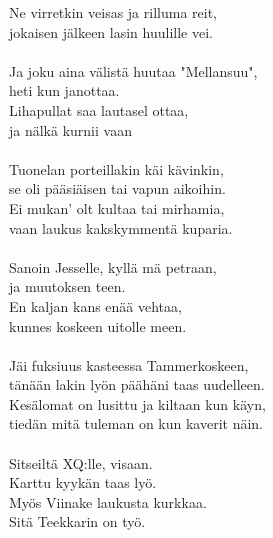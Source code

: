 Ne virretkin veisas ja rilluma reit,\\
jokaisen jälkeen lasin huulille vei.\\
\hspace{10mm} \\
Ja joku aina välistä huutaa "Mellansuu",\\
heti kun janottaa.\\
Lihapullat saa lautasel ottaa,\\
ja nälkä kurnii vaan\\
\hspace{10mm} \\
Tuonelan porteillakin käi kävinkin,\\
se oli pääsiäisen tai vapun aikoihin.\\
Ei mukan' olt kultaa tai mirhamia,\\
vaan laukus kakskymmentä kuparia.\\
\hspace{10mm} \\
Sanoin Jesselle, kyllä mä petraan,\\
ja muutoksen teen.\\
En kaljan kans enää vehtaa,\\
kunnes koskeen uitolle meen.\\
\hspace{10mm} \\
Jäi fuksiuus kasteessa Tammerkoskeen,\\
tänään lakin lyön päähäni taas uudelleen.\\
Kesälomat on lusittu ja kiltaan kun käyn,\\
tiedän mitä tuleman on kun kaverit näin.\\
\hspace{10mm} \\
Sitseiltä XQ:lle, visaan.\\
Karttu kyykän taas lyö.\\
Myös Viinake laukusta kurkkaa.\\
Sitä Teekkarin on työ.\\